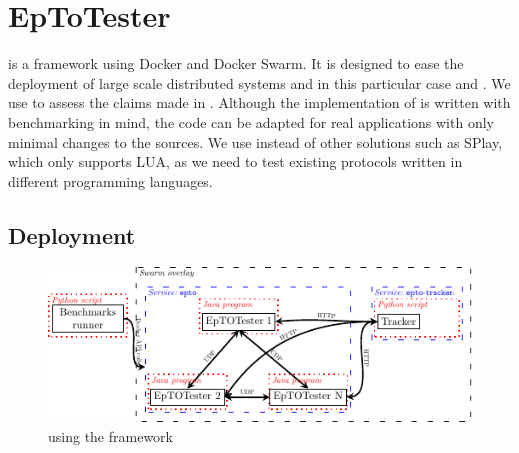 \section{EpToTester}
\label{sec:epto}
\sys is a framework using Docker and Docker Swarm. It is designed to ease the deployment of large scale distributed systems and in this particular case \jgroups and \epto. We use \sys to assess the claims made in \autocite{matos2015epto}. Although the implementation of \epto is written with benchmarking in mind, the code can be adapted for real applications with only minimal changes to the sources. We  use \sys instead of other solutions such as SPlay, which only supports LUA, as we need to test existing protocols written in different programming languages.
\subsection{Deployment}
\begin{figure}[htp]
	\centering
	\includegraphics[width=\linewidth]{figures/complete-architecture.pdf}
	\vspace{-2mm} 
	\caption[Caption]{\epto using the \sys framework\footnotemark}
	\vspace{-2mm} 
	\label{fig:complete-architecture}
\end{figure}
